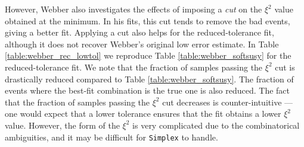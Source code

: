 \documentclass[twoside,english]{uiofysmaster}
\begin{document}


However, Webber also investigates the effects of imposing a {\it cut} on the $\xi^2$ value obtained at the minimum. In his fits, this cut tends to remove the bad events, giving a better fit. Applying a cut also helps for the reduced-tolerance fit, although it does not recover Webber's original low error estimate. In Table \ref{table:webber_rec_lowtol} we reproduce Table \ref{table:webber_softsusy} for the reduced-tolerance fit. We note that the fraction of samples passing the $\xi^2$ cut is drastically reduced compared to Table \ref{table:webber_softsusy}. The fraction of events where the best-fit combination is the true one is also reduced. The fact that the fraction of samples passing the $\xi^2$ cut decreases is counter-intuitive --- one would expect that a lower tolerance ensures that the fit obtains a lower $\xi^2$ value. However, the form of the $\xi^2$ is very complicated due to the combinatorical ambiguities, and it may be difficult for {\tt Simplex} to handle.
\end{document}
